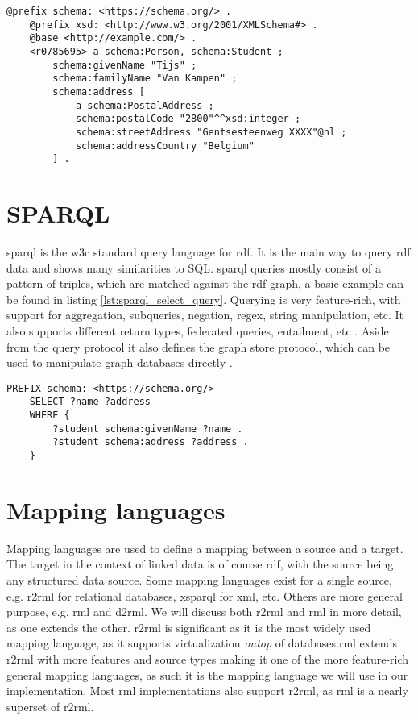 \begin{lstlisting}[caption={Basic turtle document using turtle features}, label={lst:basic_turtle_example_concise}, captionpos=b, breaklines=true]
    @prefix schema: <https://schema.org/> .
    @prefix xsd: <http://www.w3.org/2001/XMLSchema#> .
    @base <http://example.com/> .
    <r0785695> a schema:Person, schema:Student ;
        schema:givenName "Tijs" ;
        schema:familyName "Van Kampen" ;
        schema:address [
            a schema:PostalAddress ;
            schema:postalCode "2800"^^xsd:integer ;
            schema:streetAddress "Gentsesteenweg XXXX"@nl ;
            schema:addressCountry "Belgium"
        ] .
\end{lstlisting}


\section{SPARQL}
\acrfull{sparql} is the \acrshort{w3c} standard query language for \acrshort{rdf}. It is the main way to query \acrshort{rdf} data and shows many similarities to SQL. \acrshort{sparql} queries mostly consist of a pattern of triples, which are matched against the \acrshort{rdf} graph, a basic example can be found in listing \ref{lst:sparql_select_query}. Querying is very feature-rich, with support for aggregation, subqueries, negation, regex, string manipulation, etc. It also supports different return types, federated queries, entailment, etc \citep{SPARQL1.1QL}. Aside from the query protocol it also defines the graph store protocol, which can be used to manipulate graph databases directly \citep{SPARQL1.1}.

\begin{lstlisting}[language=SPARQL, caption={Example of a basic \acrshort{sparql} SELECT query}, label={lst:sparql_select_query}, captionpos=b]
    PREFIX schema: <https://schema.org/>
    SELECT ?name ?address
    WHERE {
        ?student schema:givenName ?name .
        ?student schema:address ?address .
    }
\end{lstlisting}

\section{Mapping languages}
Mapping languages are used to define a mapping between a source and a target. The target in the context of linked data is of course \acrshort{rdf}, with the source being any structured data source. Some mapping languages exist for a single source, e.g. \acrfull{r2rml} for relational databases, \acrfull{xsparql} for \acrshort{xml}, etc. Others are more general purpose, e.g. \acrfull{rml} and \acrfull{d2rml}.
We will discuss both \acrshort{r2rml} and \acrshort{rml} in more detail, as one extends the other. \acrshort{r2rml} is significant as it is the most widely used mapping language, as it supports virtualization \textit{ontop} of databases.\acrshort{rml} extends \acrshort{r2rml} with more features and source types making it one of the more feature-rich general mapping languages, as such it is the mapping language we will use in our implementation.
Most \acrshort{rml} implementations also support \acrshort{r2rml}, as \acrshort{rml} is a nearly superset of \acrshort{r2rml}.

